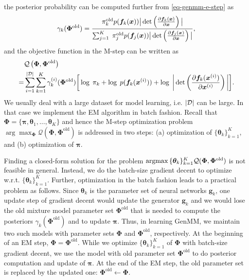 the posterior probability can be computed further from \eqref{eq-genmm-e-step} as
\begin{align}\label{eq-genmm-gamma}
  \gamma_k({\bm{\Phi}}^{\mathrm{old}}) = \frac{\pi_k^{\mathrm{old}} p(\bm{f}_k(\bm{x})) \big|\det\left( \frac{ \partial \bm{f}_k(\bm{x})}{\partial \bm{x}} \right)\big|}{\sum_{j=1}^K\; \pi_j^{\mathrm{old}} p(\bm{f}_j(\bm{x})) \big|\det\left( \frac{ \partial \bm{f}_j(\bm{x})}{\partial \bm{x}} \right)\big|},
\end{align}
and the objective function in the M-step can be written as
\begin{align}\label{eq-genmm-obj}
  &\mathcal{Q}\left(\bm{\Phi},\bm{\Phi}^{\mathrm{old}}\right)  \nonumber\\
  =&\sum_{i=1}^{| \mathcal{D} |} \sum_{k=1}^{K}\gamma_k^{(i)}(\bm{\Phi}^{\mathrm{old}})\bigg[ \log\;\pi_k +\log\;p(\bm{f}_k(\bm{x}^{(i)})) + \log\;\bigg|\det\left(\frac{ \partial \bm{f}_k(\bm{x}^{(i)})}{\partial \bm{x}^{(i)}} \right)\bigg|\bigg].
\end{align}
We usually deal with a large dataset for model learning, i.e. $| \mathcal{D} |$ can be large. In that case we implement the EM algorithm in batch fashion. 
Recall that $ \bm{\Phi}= \{\bm{\pi},\bm{\theta}_1, \dots, \bm{\theta}_K \}$ and hence the M-step optimization problem $\arg \max_{\bm{\Phi}} \mathcal{Q} (\bm{\Phi},\bm{\Phi}^{\mathrm{old}})$ is addressed in two steps: (a) optimization of $\{ \bm{\theta}_k \}_{k=1}^{K}$, and (b) optimization of $\bm{\pi}$.

Finding a closed-form solution for the problem $\operatorname{argmax}{\{\bm{\theta}_k\}_{k=1}^{K}}{ \mathcal{Q} (\bm{\Phi},\bm{\Phi}^{\mathrm{old}})}$ is not feasible in general. Instead, we do the batch-size gradient decent to optimize w.r.t. $\{\bm{\theta}_k\}_{k=1}^{K}$.
Further, optimization in the batch fashion leads to a practical problem as follows. 
Since $\bm{\theta}_k$ is the parameter set of neural networks $\bm{g}_k$, one update step of gradient decent would update the generator $\bm{g}_k$ and we would lose the old mixture model parameter set $\bm{\Phi}^{\mathrm{old}}$ that is needed to compute the posteriors $\gamma_k(\bm{\Phi}^{\mathrm{old}})$ and to update $\bm{\pi}$. Thus, in learning GenMM, we maintain two such models with parameter sets $\bm{\Phi}$ and $\bm{\Phi}^{\mathrm{old}}$, respectively. At the beginning of an EM step, $\bm{\Phi} = \bm{\Phi}^{\mathrm{old}}$. While we optimize $\{\bm{\theta}_k\}_{k=1}^{K}$ of $\bm{\Phi}$ with batch-size gradient decent, we use the model with old parameter set $\bm{\Phi}^{\mathrm{old}}$ to do posterior computation and update of $\bm{\pi}$. At the end of the EM step, the old parameter set is replaced by the updated one: $\bm{\Phi}^{\mathrm{old}}\gets \bm{\Phi}$.


